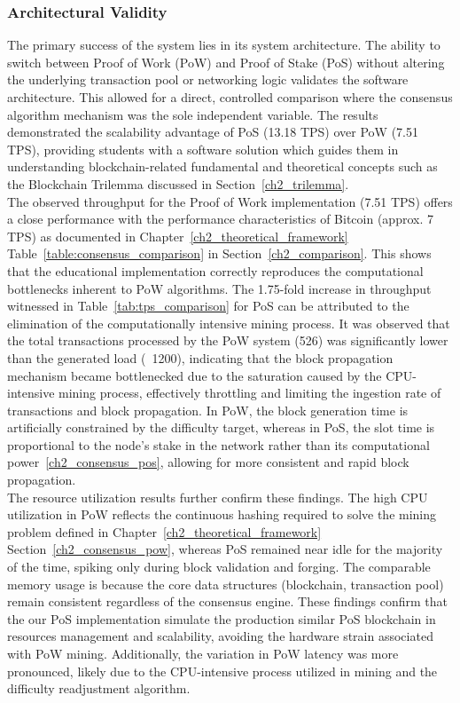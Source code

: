 \subsubsection{Architectural Validity}
The primary success of the system lies in its system architecture. The ability to switch between Proof of Work (PoW) and Proof of Stake (PoS) without altering the underlying transaction pool or networking logic validates the software architecture. This allowed for a direct, controlled comparison where the consensus algorithm mechanism was the sole independent variable. The results demonstrated the scalability advantage of PoS (13.18 TPS) over PoW (7.51 TPS), providing students with a software solution which guides them in understanding blockchain-related fundamental and theoretical concepts such as the Blockchain Trilemma discussed in Section~\ref{ch2_trilemma}.\\The observed throughput for the Proof of Work implementation (7.51 TPS) offers a close performance with the performance characteristics of Bitcoin (approx. 7 TPS) as documented in Chapter~\ref{ch2_theoretical_framework} Table~\ref{table:consensus_comparison} in Section~\ref{ch2_comparison}. This shows that the educational implementation correctly reproduces the computational bottlenecks inherent to PoW algorithms. The 1.75-fold increase in throughput witnessed in Table~\ref{tab:tps_comparison} for PoS can be attributed to the elimination of the computationally intensive mining process. It was observed that the total transactions processed by the PoW system (526) was significantly lower than the generated load (~1200), indicating that the block propagation mechanism became bottlenecked due to the saturation caused by the CPU-intensive mining process, effectively throttling and limiting the ingestion rate of transactions and block propagation. In PoW, the block generation time is artificially constrained by the difficulty target, whereas in PoS, the slot time is proportional to the node's stake in the network rather than its computational power~\ref{ch2_consensus_pos}, allowing for more consistent and rapid block propagation.\\The resource utilization results further confirm these findings. The high CPU utilization in PoW reflects the continuous hashing required to solve the mining problem defined in Chapter~\ref{ch2_theoretical_framework} Section~\ref{ch2_consensus_pow}, whereas PoS remained near idle for the majority of the time, spiking only during block validation and forging. The comparable memory usage is because the core data structures (blockchain, transaction pool) remain consistent regardless of the consensus engine. These findings confirm that the our PoS implementation simulate the production similar PoS blockchain in resources management and scalability, avoiding the hardware strain associated with PoW mining. Additionally, the variation in PoW latency was more pronounced, likely due to the CPU-intensive process utilized in mining and the difficulty readjustment algorithm.

